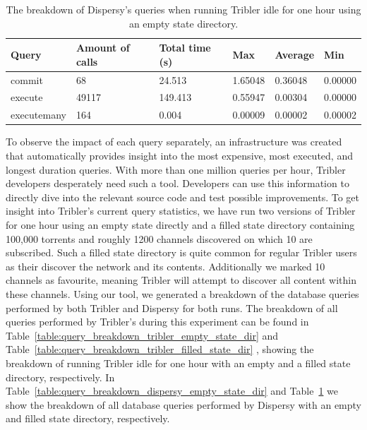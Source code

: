 \begin{table}[h]
	\centering
	\caption{The breakdown of Dispersy's queries when running Tribler idle for one hour using an empty state directory.}
	\label{table:query_breakdown_dispersy_filled_state_dir}
	\begin{tabular}{|l|l|l|l|l|l|}
		\hline
		\textbf{Query} & \textbf{Amount of calls} & \textbf{Total time (s)} & \textbf{Max} & \textbf{Average} & \textbf{Min} \\ \hline
		commit   & 68   & 24.513   & 1.65048   & 0.36048   & 0.00000   \\ \hline
		execute   & 49117   & 149.413   & 0.55947   & 0.00304   & 0.00000   \\ \hline
		executemany   & 164   & 0.004   & 0.00009   & 0.00002   & 0.00002   \\ \hline
	\end{tabular}
\end{table}

To observe the impact of each query separately, an infrastructure was created that automatically provides insight into the most expensive, most executed, and longest duration queries. 
With more than one million queries per hour, Tribler developers desperately need such a tool.
Developers can use this information to directly dive into the relevant source code and test possible improvements.
To get insight into Tribler's current query statistics, we have run two versions of Tribler for one hour using an empty state directly and a filled state directory containing 100,000 torrents and roughly 1200 channels discovered on which 10 are subscribed.
Such a filled state directory is quite common for regular Tribler users as their discover the network and its contents.
Additionally we marked 10 channels as favourite, meaning Tribler will attempt to discover all content within these channels.
Using our tool, we generated a breakdown of the database queries performed by both Tribler and Dispersy for both runs.
The breakdown of all queries performed by Tribler's during this experiment can be found in Table~\ref{table:query_breakdown_tribler_empty_state_dir} and Table~\ref{table:query_breakdown_tribler_filled_state_dir} , showing the breakdown of running Tribler idle for one hour with an empty and a filled state directory, respectively.
In Table~\ref{table:query_breakdown_dispersy_empty_state_dir} and Table~\ref{table:query_breakdown_dispersy_filled_state_dir} we show the breakdown of all database queries performed by Dispersy with an empty and filled state directory, respectively.

